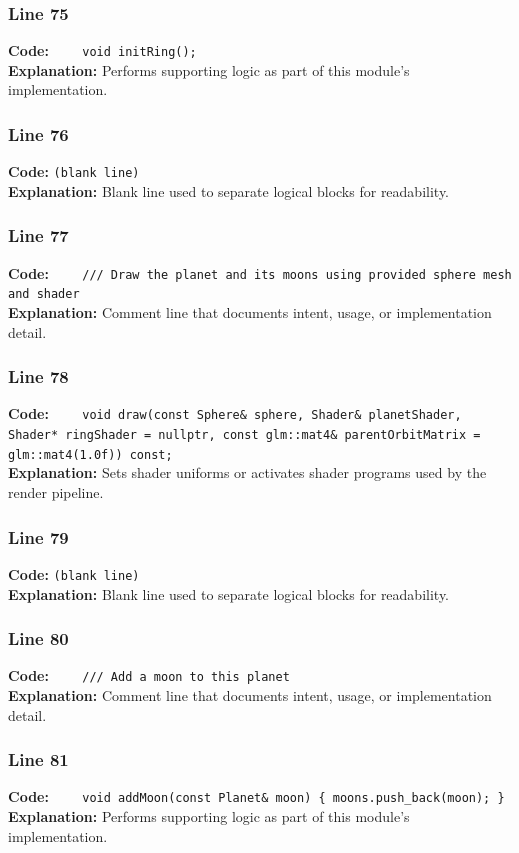 \documentclass[11pt,a4paper]{article}
\begin{document}
\subsubsection*{Line 75}
\textbf{Code:} \verb|    void initRing();|\\
\textbf{Explanation:} Performs supporting logic as part of this module's implementation.

\subsubsection*{Line 76}
\textbf{Code:} \texttt{(blank line)}\\
\textbf{Explanation:} Blank line used to separate logical blocks for readability.

\subsubsection*{Line 77}
\textbf{Code:} \verb|    /// Draw the planet and its moons using provided sphere mesh and shader|\\
\textbf{Explanation:} Comment line that documents intent, usage, or implementation detail.

\subsubsection*{Line 78}
\textbf{Code:} \verb|    void draw(const Sphere& sphere, Shader& planetShader, Shader* ringShader = nullptr, const glm::mat4& parentOrbitMatrix = glm::mat4(1.0f)) const;|\\
\textbf{Explanation:} Sets shader uniforms or activates shader programs used by the render pipeline.

\subsubsection*{Line 79}
\textbf{Code:} \texttt{(blank line)}\\
\textbf{Explanation:} Blank line used to separate logical blocks for readability.

\subsubsection*{Line 80}
\textbf{Code:} \verb|    /// Add a moon to this planet|\\
\textbf{Explanation:} Comment line that documents intent, usage, or implementation detail.

\subsubsection*{Line 81}
\textbf{Code:} \verb|    void addMoon(const Planet& moon) { moons.push_back(moon); }|\\
\textbf{Explanation:} Performs supporting logic as part of this module's implementation.
\end{document}

